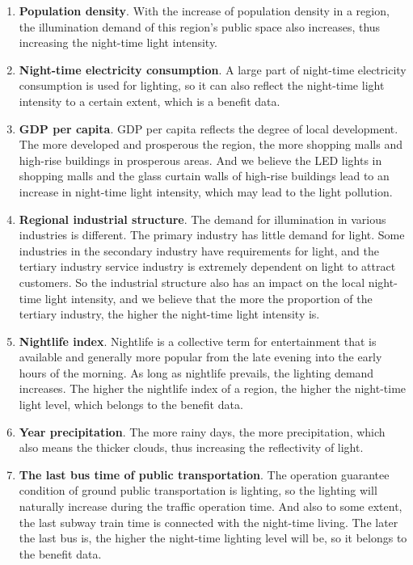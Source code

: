 \begin{enumerate}
    \item \textbf{Population density}. With the increase of population density in a region, the illumination demand of this region's public space also increases, thus increasing the night-time light intensity.
 
    \item \textbf{Night-time electricity consumption}. A large part of night-time electricity consumption is used for lighting, so it can also reflect the night-time light intensity to a certain extent, which is a benefit data. 
     
    \item \textbf{GDP per capita}. GDP per capita reflects the degree of local development. The more developed and prosperous the region, the more shopping malls and high-rise buildings in prosperous areas. And we believe the LED lights in shopping malls and the glass curtain walls of high-rise buildings lead to an increase in night-time light intensity, which may lead to the light pollution.
     
    \item \textbf{Regional industrial structure}. The demand for illumination in various industries is different. The primary industry has little demand for light. Some industries in the secondary industry have requirements for light, and the tertiary industry service industry is extremely dependent on light to attract customers. So the industrial structure also has an impact on the local night-time light intensity, and we believe that the more the proportion of the tertiary industry, the higher the night-time light intensity is. 
     
    \item \textbf{Nightlife index}. Nightlife is a collective term for entertainment that is available and generally more popular from the late evening into the early hours of the morning. As long as nightlife prevails, the lighting demand increases. The higher the nightlife index of a region, the higher the night-time light level, which belongs to the benefit data.
    
    \item \textbf{Year precipitation}. The more rainy days, the more precipitation, which also means the thicker clouds, thus increasing the reflectivity of light. 

    \item \textbf{The last bus time of public transportation}. The operation guarantee condition of ground public transportation is lighting, so the lighting will naturally increase during the traffic operation time. And also to some extent, the last subway train time is connected with the night-time living. The later the last bus is, the higher the night-time lighting level will be, so it belongs to the benefit data.
    
\end{enumerate}

